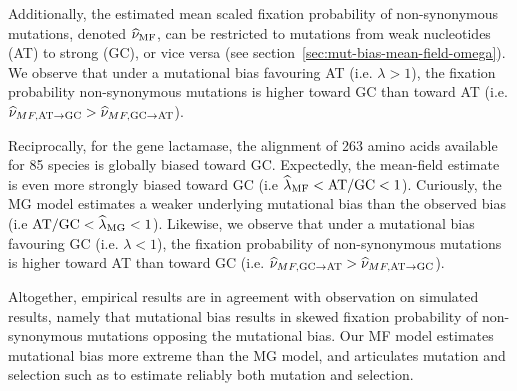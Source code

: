 Additionally, the estimated mean scaled fixation probability of non-synonymous mutations, denoted $\widehat{\nu}_{\text{MF}}$, can be restricted to mutations from weak nucleotides (AT) to strong (GC), or vice versa (see section~\ref{sec:mut-bias-mean-field-omega}).
We observe that under a mutational bias favouring AT (i.e. $\lambda > 1$), the fixation probability non-synonymous mutations is higher toward GC than toward AT (i.e. $\widehat{\nu}_{MF,\text{AT} \rightarrow \text{GC}} > \widehat{\nu}_{MF,\text{GC} \rightarrow \text{AT}}$).

Reciprocally, for the gene lactamase, the alignment of 263 amino acids available for 85 species is globally biased toward GC.
Expectedly, the mean-field estimate is even more strongly biased toward GC (i.e $\widehat{\lambda}_{\text{MF}} < \text{AT/GC} < 1$).
Curiously, the MG model estimates a weaker underlying mutational bias than the observed bias (i.e $ \text{AT/GC} < \widehat{\lambda}_{\text{MG}} < 1$).
Likewise, we observe that under a mutational bias favouring GC (i.e. $\lambda < 1$), the fixation probability of non-synonymous mutations is higher toward AT than toward GC (i.e. $\widehat{\nu}_{MF,\text{GC} \rightarrow \text{AT}} > \widehat{\nu}_{MF,\text{AT} \rightarrow \text{GC}}$).

Altogether, empirical results are in agreement with observation on simulated results, namely that mutational bias results in skewed fixation probability of non-synonymous mutations opposing the mutational bias.
Our MF model estimates mutational bias more extreme than the MG model, and articulates mutation and selection such as to estimate reliably both mutation and selection.


